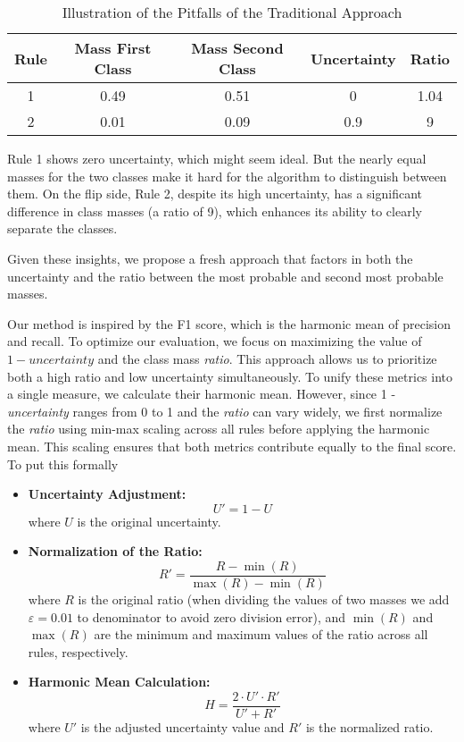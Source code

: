 \documentclass[10pt,a4paper,oneside]{article}
\begin{document}
\begin{table}[ht]
    \centering
    \caption{Illustration of the Pitfalls of the Traditional Approach}
    \label{table-pitfalls}
    \begin{tabular}{c|c|c|c|c}
        \toprule
        \textbf{Rule} & \textbf{Mass First Class} & \textbf{Mass Second Class} & \textbf{Uncertainty} & \textbf{Ratio} \\
        \midrule
        1 & 0.49 & 0.51 & 0 & 1.04 \\
        2 & 0.01 & 0.09 & 0.9 & 9 \\
        \bottomrule
    \end{tabular}

\end{table}
\newpage
Rule 1 shows zero uncertainty, which might seem ideal. But the nearly equal masses for the two classes make it hard for the algorithm to distinguish between them. On the flip side, Rule 2, despite its high uncertainty, has a significant difference in class masses (a ratio of 9), which enhances its ability to clearly separate the classes.

Given these insights, we propose a fresh approach that factors in both the uncertainty and the ratio between the most probable and second most probable masses.

Our method is inspired by the F1 score, which is the harmonic mean of precision and recall. To optimize our evaluation, we focus on maximizing the value of $1 - \textit{uncertainty}$ and the class mass \textit{ratio}. This approach allows us to prioritize both a high ratio and low uncertainty simultaneously. To unify these metrics into a single measure, we calculate their harmonic mean. However, since 1 - \textit{uncertainty} ranges from 0 to 1 and the \textit{ratio} can vary widely, we first normalize the \textit{ratio} using min-max scaling across all rules before applying the harmonic mean. This scaling ensures that both metrics contribute equally to the final score.
To put this formally 
\begin{itemize}
    \item \textbf{Uncertainty Adjustment:}
    \[
    U' = 1 - U
    \]
    where \( U \) is the original uncertainty.

    \item \textbf{Normalization of the Ratio:}
    \[
    R' = \frac{R - \min(R)}{\max(R) - \min(R)}
    \]
    where \( R \) is the original ratio (when dividing the values of two masses we add $\varepsilon=0.01$ to denominator to avoid zero division error), and \( \min(R) \) and \( \max(R) \) are the minimum and maximum values of the ratio across all rules, respectively.

    \item \textbf{Harmonic Mean Calculation:}
    \[
    H = \frac{2 \cdot U' \cdot R'}{U' + R'}
    \]
    where \( U' \) is the adjusted uncertainty value and \( R' \) is the normalized ratio.
\end{itemize}
\end{document}
